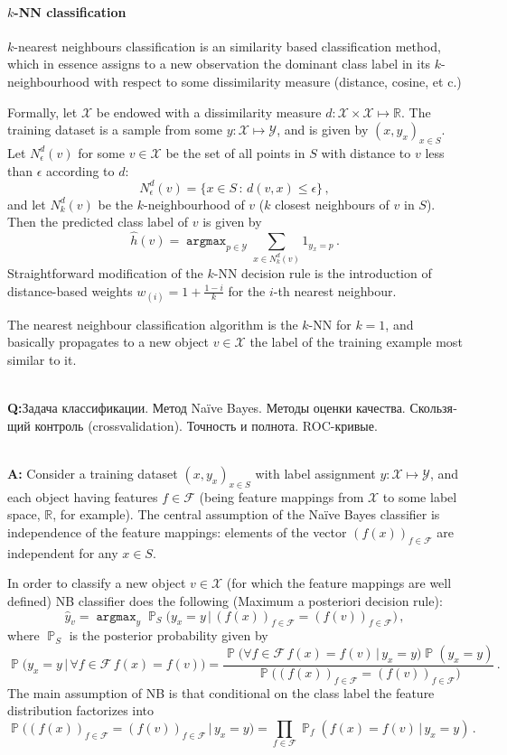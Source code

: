 \documentclass[a4paper,14pt]{extarticle}
\newcommand{\Fcal}{\mathcal{F}}
\newcommand{\Xcal}{\mathcal{X}}
\newcommand{\Ycal}{\mathcal{Y}}
\newcommand{\Real}{\mathbb{R}}
\newcommand{\argmax}{\mathop{\mathtt{argmax}}\nolimits}
\newcommand{\pr}{\mathop{\mathbb{P}}\nolimits}
\newcommand{\rus}[1]{\foreignlanguage{russian}{#1}}
\begin{document}

\paragraph{$k$-NN classification} %
\label{par:kNN_clssification}

$k$-nearest neighbours classification is an similarity based classification method,
which in essence assigns to a new observation the dominant class label in its $k$-
neighbourhood with respect to some dissimilarity measure (distance, cosine, et c.)

Formally, let $\Xcal$ be endowed with a dissimilarity measure $d:\Xcal\times \Xcal
\mapsto \Real$. The training dataset is a sample from some $y:\Xcal\mapsto \Ycal$,
and is given by $(x, y_x)_{x\in S}$. Let $N_\epsilon^d(v)$ for some $v\in \Xcal$
be the set of all points in $S$ with distance to $v$ less than $\epsilon$ according
to $d$:
$$ N_\epsilon^d(v) = \{x\in S\,:\, d(v, x) \leq \epsilon \} \,, $$
and let $N_k^d(v)$ be the $k$-neighbourhood of $v$ ($k$ closest neighbours of $v$
in $S$). Then the predicted class label of $v$ is given by
$$ \hat{h}(v) = \argmax_{p\in \Ycal} \sum_{x\in N_k^d(v)} 1_{y_x = p}\,. $$
Straightforward modification of the $k$-NN decision rule is the introduction of
distance-based weights $w_{(i)} = 1 + \frac{1-i}{k}$ for the $i$-th nearest neighbour.

The nearest neighbour classification algorithm is the $k$-NN for $k=1$, and basically
propagates to a new object $v\in \Xcal$ the label of the training example most similar
to it.


\hfill\\\textbf{Q:}\rus{Задача классификации.  Метод Naïve Bayes. Методы оценки
качества. Скользящий контроль (crossvalidation). Точность и полнота. ROC-кривые.}

\hfill\\\textbf{A:}
Consider a training dataset $(x, y_x)_{x\in S}$ with label assignment $y:\Xcal\mapsto
\Ycal$, and each object having features $f\in \Fcal$ (being feature mappings from
$\Xcal$ to some label space, $\Real$, for example). The central assumption of the
Na\"ive Bayes classifier is independence of the feature mappings: elements of the
vector $(f(x))_{f\in \Fcal}$ are independent for any $x\in S$.

In order to classify a new object $v\in \Xcal$ (for which the feature mappings are
well defined) NB classifier does the following (Maximum a posteriori decision rule):
$$ \hat{y}_v
    = \argmax_y \pr_S\bigl(y_x = y \,|\,
            (f(x))_{f\in \Fcal} = (f(v))_{f\in \Fcal}\bigr)
    \,, $$
where $\pr_S$ is the posterior probability given by
$$ \pr\bigl(y_x = y \,|\, \forall f\in \Fcal\, f(x) = f(v)\bigr)
    = \frac{\pr\bigl(\forall f\in \Fcal\, f(x) = f(v) \,|\, y_x = y\bigr)
            \pr(y_x = y)}
        {\pr\bigl((f(x))_{f\in \Fcal} = (f(v))_{f\in \Fcal}\bigr)}
    \,. $$
The main assumption of NB is that conditional on the class label the feature distribution
factorizes into
$$ \pr\bigl((f(x))_{f\in \Fcal} = (f(v))_{f\in \Fcal} \,|\, y_x = y\bigr)
    = \prod_{f\in \Fcal} \pr_f(f(x) = f(v) \,|\, y_x = y)
    \,. $$ 
\end{document}
